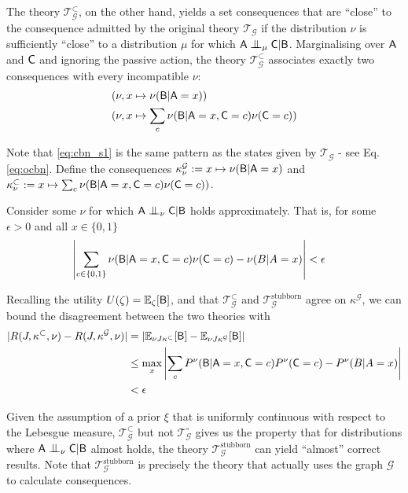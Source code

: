 \begin{example}
The theory $\mathscr{T}_{\mathcal{G}}^\subset$, on the other hand, yields a set consequences that are ``close'' to the consequence admitted by the original theory $\mathscr{T}_{\mathcal{G}}$ if the distribution $\nu$ is sufficiently ``close'' to a distribution $\mu$ for which $\RV{A} \CI_\mu \RV{C} | \RV{B}$. Marginalising over $\mathsf{A}$ and $\mathsf{C}$ and ignoring the passive action, the theory $\mathscr{T}^\subset_{\mathcal{G}}$ associates exactly two consequences with every incompatible $\nu$:
\begin{align}
    &(\nu,x\mapsto \nu(\mathsf{B}|\mathsf{A}=x) )\label{eq:cbn_s1}\\
    &(\nu,x \mapsto \sum_c \nu(\mathsf{B}|\mathsf{A}=x,\mathsf{C}=c)\nu(\mathsf{C}=c)) \label{eq:cbn_s2}
\end{align}

Note that \ref{eq:cbn_s1} is the same pattern as the states given by $\mathscr{T}_{\mathcal{G}}$ - see Eq. \ref{eq:ocbn}. Define the consequences $\kappa^\mathcal{G}_\nu := x\mapsto \nu(\mathsf{B}|\mathsf{A}=x)$ and $\kappa^\subset_\nu:= x \mapsto \sum_c \nu(\mathsf{B}|\mathsf{A}=x,\mathsf{C}=c)\nu(\mathsf{C}=c))$.

Consider some $\nu$ for which $\RV{A} \CI_\nu \RV{C} | \RV{B}$ holds approximately. That is, for some $\epsilon>0$ and all $x\in\{0,1\}$
\begin{align}
    \left|\sum_{c\in\{0,1\}} \nu(\mathsf{B}|\mathsf{A}=x,\mathsf{C}=c)\nu(\mathsf{C}=c)-\nu(B|A=x)\right| &< \epsilon \label{eq:app_ci}
\end{align}

Recalling the utility $U(\zeta)=\mathbb{E}_\zeta[\mathsf{B}]$, and that $\mathscr{T}^\subset_\mathcal{G}$ and $\mathscr{T}^\mathrm{stubborn}_\mathcal{G}$ agree on $\kappa^\mathcal{G}$, we can bound the disagreement between the two theories with
\begin{align}
    |R(J,\kappa^\subset,\nu) - R(J,\kappa^\mathcal{G},\nu)| &=  \left|\mathbb{E}_{\nu J \kappa^\subset} [\mathsf{B}] - \mathbb{E}_{\nu J \kappa^\mathcal{G}} [\mathsf{B}]\right|\\
        &\leq \max_x \left|\sum_c P^\nu(\mathsf{B}|\mathsf{A}=x,\mathsf{C}=c)P^\nu(\mathsf{C}=c)-P^\nu(B|A=x) \right|\\
        &< \epsilon
\end{align}

Given the assumption of a prior $\xi$ that is uniformly continuous with respect to the Lebesgue measure, $\mathscr{T}_{\mathcal{G}}^\subset$ but not $\mathscr{T}_{\mathcal{G}}^\circ$ gives us the property that for distributions where $\RV{A} \CI_\nu \RV{C} | \RV{B}$ almost holds, the theory $\mathscr{T}_{\mathscr{G}}^{\mathrm{stubborn}}$ can yield ``almost'' correct results. Note that $\mathscr{T}_{\mathscr{G}}^{\mathrm{stubborn}}$ is precisely the theory that actually uses the graph $\mathcal{G}$ to calculate consequences.
\end{example}

